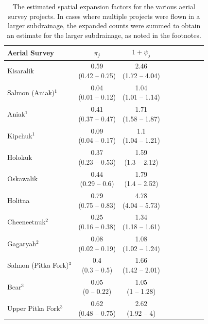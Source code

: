 \documentclass[12pt,]{book}
\theoremstyle{definition}
\theoremstyle{definition}
\theoremstyle{definition}
\theoremstyle{remark}
\begin{document}
\begin{table}[H]

\caption{\label{tab:spat-expand-table}The estimated spatial expansion factors for the various aerial survey projects.
      In cases where multiple projects were flown in a larger subdrainage, the expanded counts
      were summed to obtain an estimate for the larger subdrainage, as noted in the footnotes.}
\centering
\begin{tabular}[t]{lcclcclcc}
\toprule
Aerial Survey & $\pi_j$ & $1 + \psi_j$\\
\midrule
Kisaralik & \makecell[c]{0.59\\(0.42 -- 0.75)} & \makecell[c]{2.46\\(1.72 -- 4.04)}\\
Salmon (Aniak)$^1$ & \makecell[c]{0.04\\(0.01 -- 0.12)} & \makecell[c]{1.04\\(1.01 -- 1.14)}\\
Aniak$^1$ & \makecell[c]{0.41\\(0.37 -- 0.47)} & \makecell[c]{1.71\\(1.58 -- 1.87)}\\
Kipchuk$^1$ & \makecell[c]{0.09\\(0.04 -- 0.17)} & \makecell[c]{1.1\\(1.04 -- 1.21)}\\
Holokuk & \makecell[c]{0.37\\(0.23 -- 0.53)} & \makecell[c]{1.59\\(1.3 -- 2.12)}\\
\addlinespace
Oskawalik & \makecell[c]{0.44\\(0.29 -- 0.6)} & \makecell[c]{1.79\\(1.4 -- 2.52)}\\
Holitna & \makecell[c]{0.79\\(0.75 -- 0.83)} & \makecell[c]{4.78\\(4.04 -- 5.73)}\\
Cheeneetnuk$^2$ & \makecell[c]{0.25\\(0.16 -- 0.38)} & \makecell[c]{1.34\\(1.18 -- 1.61)}\\
Gagaryah$^2$ & \makecell[c]{0.08\\(0.02 -- 0.19)} & \makecell[c]{1.08\\(1.02 -- 1.24)}\\
Salmon (Pitka Fork)$^3$ & \makecell[c]{0.4\\(0.3 -- 0.5)} & \makecell[c]{1.66\\(1.42 -- 2.01)}\\
\addlinespace
Bear$^3$ & \makecell[c]{0.05\\(0 -- 0.22)} & \makecell[c]{1.05\\(1 -- 1.28)}\\
Upper Pitka Fork$^3$ & \makecell[c]{0.62\\(0.48 -- 0.75)} & \makecell[c]{2.62\\(1.92 -- 4)}\\
\bottomrule
\end{tabular}
\end{table}
\end{document}
